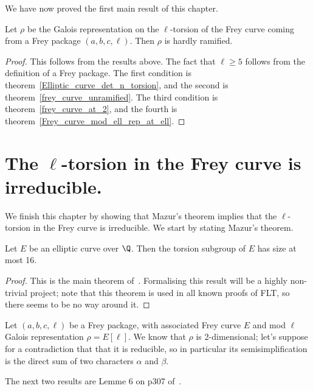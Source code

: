 We have now proved the first main result of this chapter.

\begin{theorem}\label{frey_curve_hardly_ramified}\notready Let $\rho$ be the Galois representation on the
  $\ell$-torsion of the Frey curve coming from a Frey package $(a,b,c,\ell)$. Then $\rho$ is hardly
  ramified.
\end{theorem}
\begin{proof}
  This follows from the results above. The fact that $\ell\geq 5$ follows from the definition of
  a Frey package. The first condition is theorem~\ref{Elliptic_curve_det_n_torsion},
  and the second is theorem~\ref{frey_curve_unramified}. The third condition is
  theorem~\ref{frey_curve_at_2}, and the fourth is theorem~\ref{Frey_curve_mod_ell_rep_at_ell}.
\end{proof}

\section[The l-torsion in the Frey curve is irreducible.]{The $\ell$-torsion in the Frey curve is irreducible.}

We finish this chapter by showing that Mazur's theorem implies that the $\ell$-torsion in the Frey
 curve is irreducible. We start by stating Mazur's theorem.

\begin{theorem}\label{mazur}\notready Let $E$ be an elliptic curve over $\Q$. Then the torsion subgroup
  of $E$ has size at most 16.
\end{theorem}
\begin{proof}\notready
  This is the main theorem of~\cite{mazur-torsion}. Formalising this result will be a highly
  non-trivial project; note that this theorem is used in all known proofs of FLT, so there
  seems to be no way around it.
\end{proof}

Let $(a,b,c,\ell)$ be a Frey package, with associated Frey curve $E$ and mod $\ell$ Galois
 representation $\rho=E[\ell]$. We know that $\rho$ is 2-dimensional; let's suppose for a
 contradiction that that it is
 reducible, so in particular its semisimplification is the direct sum of two characters $\alpha$
 and $\beta$.

 The next two results are Lemme 6 on p307 of~\cite{serrepropgal}.


